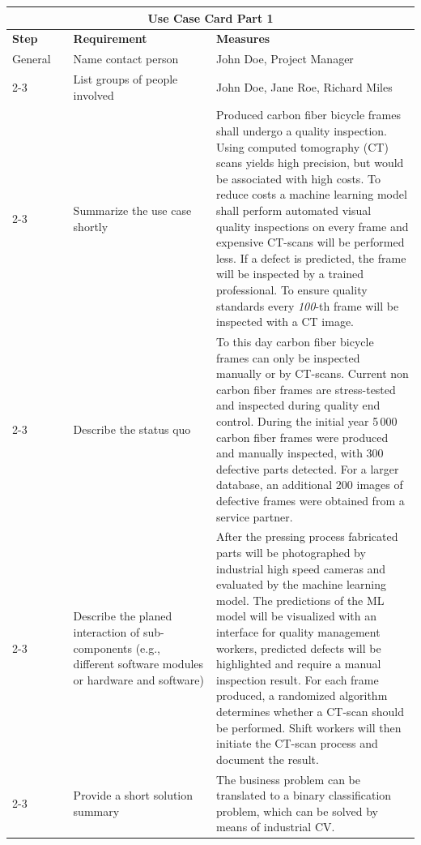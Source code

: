 \newpage
{\small
\begin{longtable}{p{0.15\linewidth}|p{0.35\linewidth}p{0.5\linewidth}}  
    \toprule
    \multicolumn{3}{c}{\bf{Use Case Card Part 1}}\\
    \toprule
    \bf{Step} & \bf{Requirement} & \bf{Measures} \\
    \hline
    \hline
    General 
        & Name contact person                 & John Doe, Project Manager \\\cline{2-3}  
        & List groups of people involved      & John Doe, Jane Roe, Richard Miles \\\cline{2-3}  
        & Summarize the use case shortly      & Produced carbon fiber bicycle frames shall undergo a quality inspection. Using computed tomography (CT) scans yields high precision, but would be associated with high costs. To reduce costs a machine learning model shall perform automated visual quality inspections on every frame and expensive CT-scans will be performed less. If a defect is predicted, the frame will be inspected by a trained professional. To ensure quality standards every \textit{100}-th frame will be inspected with a CT image. \\\cline{2-3}  
        & Describe the status quo             & To this day carbon fiber bicycle frames can only be inspected manually or by CT-scans. Current non carbon fiber frames are stress-tested and inspected during quality end control. During the initial year 5\,000 carbon fiber frames were produced and manually inspected, with 300 defective parts detected. For a larger database, an additional 200 images of defective frames were obtained from a service partner. \\\cline{2-3}  
        & Describe the planed interaction of sub-components (e.g., different software modules or hardware and software)   & After the pressing process fabricated parts will be photographed by industrial high speed cameras and evaluated by the machine learning model. The predictions of the ML model will be visualized with an interface for quality management workers, predicted defects will be highlighted and require a manual inspection result. For each frame produced, a randomized algorithm determines whether a CT-scan should be performed. Shift workers will then initiate the CT-scan process and document the result.   \\\cline{2-3}  
        & Provide a short solution summary    & The business problem can be translated to a binary classification problem, which can be solved by means of industrial CV. \\
        

\end{longtable}}
